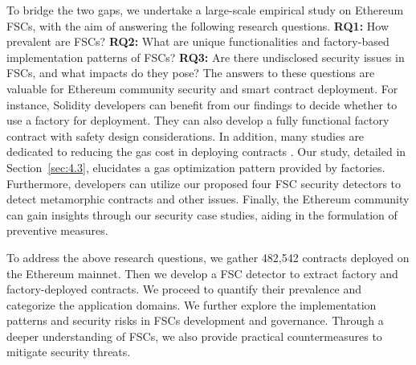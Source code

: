 \documentclass[acmsmall,screen]{acmart}
\begin{document}
	To bridge the two gaps, we undertake a large-scale empirical study on Ethereum FSCs, with the aim of answering the following research questions. \textbf{RQ1:} How prevalent are FSCs? \textbf{RQ2:} What are unique functionalities and factory-based implementation patterns of FSCs? \textbf{RQ3:} Are there undisclosed security issues in FSCs, and what impacts do they pose? The answers to these questions are valuable for Ethereum community security and smart contract deployment. For instance, Solidity developers can benefit from our findings to decide whether to use a factory for deployment. They can also develop a fully functional factory contract with safety design considerations. In addition, many studies are dedicated to reducing the gas cost in deploying contracts \cite{DBLP:conf/kbse/Li21a,DBLP:journals/jss/SorboLVVC22,DBLP:journals/tosem/AlbertGHRS22}. Our study, detailed in Section~\ref{sec:4.3}, elucidates a gas optimization pattern provided by factories. Furthermore, developers can utilize our proposed four FSC security detectors to detect metamorphic contracts and other issues. Finally, the Ethereum community can gain insights through our security case studies, aiding in the formulation of preventive measures.

	To address the above research questions, we gather 482,542 contracts deployed on the Ethereum mainnet. Then we develop a FSC detector to extract factory and factory-deployed contracts. We proceed to quantify their prevalence and categorize the application domains. We further explore the implementation patterns and security risks in FSCs development and governance. Through a deeper understanding of FSCs, we also provide practical countermeasures to mitigate security threats.
\end{document}
